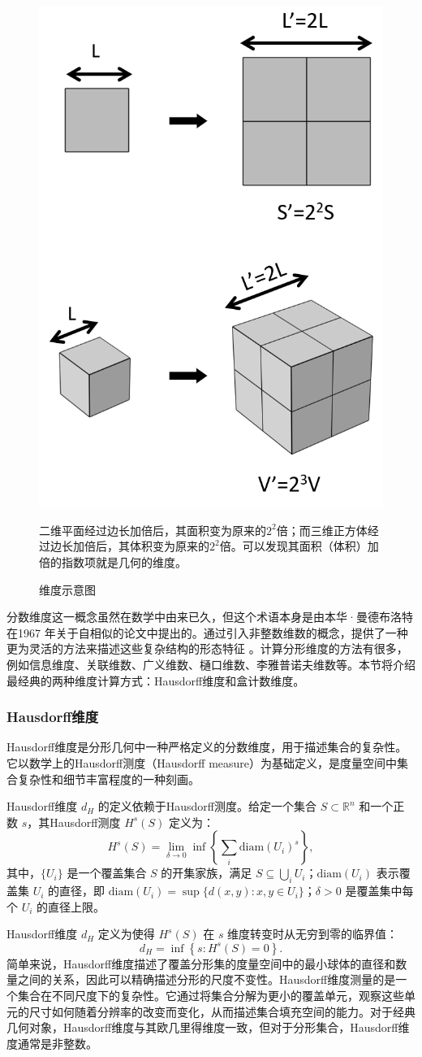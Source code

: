 \begin{figure}[htbp]
    \centering
    \includegraphics[width=0.3\linewidth]{figure/FractalTopo/Dimension.png}
    \caption{维度示意图}二维平面经过边长加倍后，其面积变为原来的$2^2$倍；而三维正方体经过边长加倍后，其体积变为原来的$2^2$倍。可以发现其面积（体积）加倍的指数项就是几何的维度。
    \label{fig:enter-label}
\end{figure}

分数维度这一概念虽然在数学中由来已久，但这个术语本身是由本华·曼德布洛特在1967 年关于自相似的论文中提出的\cite{mandelbrot1967coast}。通过引入非整数维数的概念，提供了一种更为灵活的方法来描述这些复杂结构的形态特征 \cite{Mandelbrot1982,falconer2013fractal}。计算分形维度的方法有很多，例如信息维度、关联维数、广义维数、樋口维数、李雅普诺夫维数等。本节将介绍最经典的两种维度计算方式：Hausdorff维度和盒计数维度。

\subsubsection{Hausdorff维度}
Hausdorff维度是分形几何中一种严格定义的分数维度，用于描述集合的复杂性。它以数学上的Hausdorff测度（Hausdorff measure）为基础定义，是度量空间中集合复杂性和细节丰富程度的一种刻画。

Hausdorff维度 $d_H$ 的定义依赖于Hausdorff测度。给定一个集合 $S \subset \mathbb{R}^n$ 和一个正数 $s$，其Hausdorff测度 $H^s(S)$ 定义为：
\begin{equation}
    H^s(S) = \lim_{\delta \to 0} \inf \left\{ \sum_i \text{diam}(U_i)^s \right\},
\end{equation}
其中，$\{U_i\}$ 是一个覆盖集合 $S$ 的开集家族，满足 $S \subseteq \bigcup_i U_i$；$\text{diam}(U_i)$ 表示覆盖集 $U_i$ 的直径，即 $\text{diam}(U_i) = \sup\{d(x, y) : x, y \in U_i\}$；$\delta > 0$ 是覆盖集中每个 $U_i$ 的直径上限。

Hausdorff维度 $d_H$ 定义为使得 $H^s(S)$ 在 $s$ 维度转变时从无穷到零的临界值：
\begin{equation}
d_H = \inf \left\{ s : H^s(S) = 0 \right\}.
\end{equation}
简单来说，Hausdorff维度描述了覆盖分形集的度量空间中的最小球体的直径和数量之间的关系，因此可以精确描述分形的尺度不变性。Hausdorff维度测量的是一个集合在不同尺度下的复杂性。它通过将集合分解为更小的覆盖单元，观察这些单元的尺寸如何随着分辨率的改变而变化，从而描述集合填充空间的能力。对于经典几何对象，Hausdorff维度与其欧几里得维度一致，但对于分形集合，Hausdorff维度通常是非整数。


